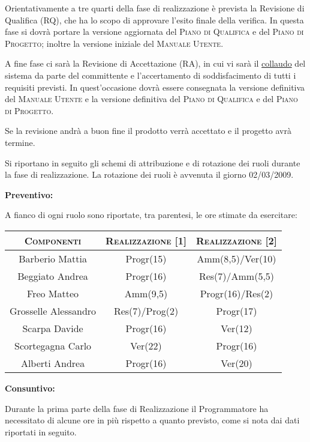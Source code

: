 \documentclass[11pt,a4paper]{article}
\begin{document}
Orientativamente a tre quarti della fase di realizzazione è prevista la Revisione di Qualifica (RQ), che ha lo scopo di approvare l'esito finale della verifica. In questa fase si dovrà portare la versione aggiornata del \textsc{Piano di Qualifica} e del \textsc{Piano di Progetto}; inoltre la versione iniziale del \textsc{Manuale Utente}.

A fine fase ci sarà la Revisione di Accettazione (RA), in cui vi sarà il \underline{collaudo} del sistema da parte del committente e l'accertamento di soddisfacimento di tutti i requisiti previsti. In quest'occasione dovrà essere consegnata la versione definitiva del \textsc{Manuale Utente} e la versione definitiva del \textsc{Piano di Qualifica} e del \textsc{Piano di Progetto}.

Se la revisione andrà a buon fine il prodotto verrà accettato e il progetto avrà termine.

Si riportano in seguito gli schemi di attribuzione e di rotazione dei ruoli durante la fase di realizzazione. La rotazione dei ruoli è avvenuta il giorno 02/03/2009.

\bigskip \bigskip
\begin{large}\textbf{Preventivo:}\end{large}
\newline
A fianco di ogni ruolo sono riportate, tra parentesi, le ore stimate da esercitare:
\\
\begin{center}
\begin{tabular}{|c||c|c|}
\hline
\textsc{Componenti} & \textsc{Realizzazione [1]} & \textsc{Realizzazione [2]} \\ \hline \hline
Barberio Mattia & Progr(15) & Amm(8,5)/Ver(10) \\ \hline
Beggiato Andrea & Progr(16) & Res(7)/Amm(5,5) \\ \hline
Freo Matteo & Amm(9,5) & Progr(16)/Res(2) \\ \hline
Grosselle Alessandro & Res(7)/Prog(2) & Progr(17) \\ \hline
Scarpa Davide & Progr(16) & Ver(12) \\ \hline
Scortegagna Carlo & Ver(22) & Progr(16) \\ \hline
Alberti Andrea & Progr(16) & Ver(20) \\ \hline
\end{tabular}
\end{center}

\bigskip \bigskip
\begin{large}\textbf{Consuntivo:}\end{large}
\newline
Durante la prima parte della fase di Realizzazione il Programmatore ha necessitato di alcune ore in più rispetto a quanto previsto, come si nota dai dati riportati in seguito.
\end{document}
